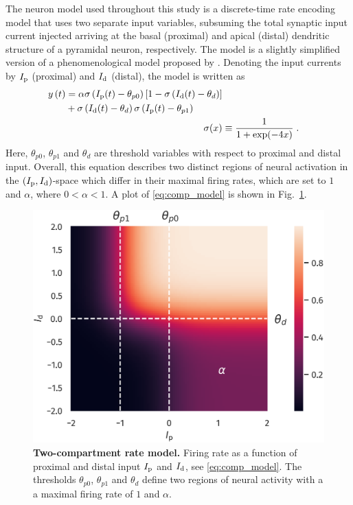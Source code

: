 \documentclass[10pt,a4paper,twocolumn]{article}
\begin{document}
		The neuron model used throughout this study is a discrete-time rate encoding model that
		uses two separate input variables, subsuming the total synaptic
		input current injected arriving at the basal (proximal) and apical (distal) 
		dendritic structure of a pyramidal neuron, respectively. The model is a slightly
		simplified version of a phenomenological model proposed by \citet{Shai_2015}.
		Denoting the input currents by $I_{\rm p}$ (proximal) and $I_{\rm d}$ (distal), 
		the model is written as
		\begin{align}
		\begin{split}
		y\left(t\right) &= \alpha  \sigma\left( I_{\rm p}(t) - \theta_{p0} \right)
		\left[1-\sigma\left(I_{\rm d}(t) - \theta_d\right)\right] \\
		&+ \sigma\left(I_{\rm d}(t) - \theta_d \right)\sigma\left( I_{\rm p}(t) - \theta_{p1} \right)
		\end{split} \label{eq:comp_model}\\
		\sigma(x) &\equiv \frac{1}{1+\exp(-4x)} \; .
		\end{align}
		Here, $\theta_{p0}$, $\theta_{p1}$ and $\theta_d$ are threshold variables with
		respect to proximal and distal input. Overall, this equation describes two distinct
		regions of neural activation in the $(I_{\rm p}, I_{\rm d})$-space which differ in their
		maximal firing rates, which are set to $1$ and $\alpha$, where $0 < \alpha < 1$.
		A plot of \eqref{eq:comp_model} is shown in Fig.~\ref{fig:comp_model}.
		\begin{figure}
			\centering
			\includegraphics[width=0.8\columnwidth]{plot_comp_mod_marks.png}
			\caption{{\bf Two-compartment rate model.} Firing rate as a
			function of proximal and distal input $I_{\rm p}$ and $I_{\rm d}$, 
			see \eqref{eq:comp_model}. 
			The thresholds $\theta_{p0}$, $\theta_{p1}$ and $\theta_d$ define
			two regions of neural activity with a a maximal firing rate of $1$
			and $\alpha$.}
			\label{fig:comp_model}
		\end{figure}
		
\end{document}

